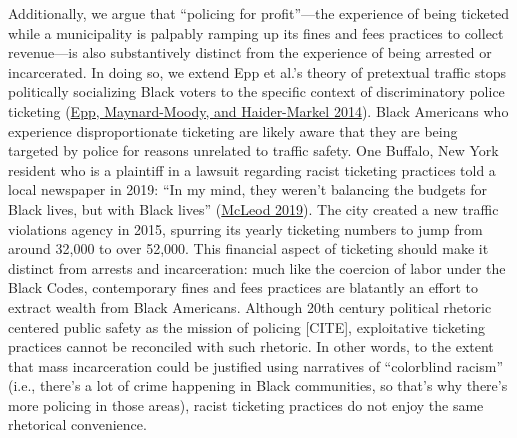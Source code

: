 \documentclass[
  12pt,
]{article}
\begin{document}
Additionally, we argue that ``policing for profit''---the experience of being ticketed while a municipality is palpably ramping up its fines and fees practices to collect revenue---is also substantively distinct from the experience of being arrested or incarcerated. In doing so, we extend Epp et al.'s theory of pretextual traffic stops politically socializing Black voters to the specific context of discriminatory police ticketing (\protect\hyperlink{ref-Epp2014}{Epp, Maynard-Moody, and Haider-Markel 2014}). Black Americans who experience disproportionate ticketing are likely aware that they are being targeted by police for reasons unrelated to traffic safety. One Buffalo, New York resident who is a plaintiff in a lawsuit regarding racist ticketing practices told a local newspaper in 2019: ``In my mind, they weren't balancing the budgets for Black lives, but with Black lives'' (\protect\hyperlink{ref-McLeod2019}{McLeod 2019}). The city created a new traffic violations agency in 2015, spurring its yearly ticketing numbers to jump from around 32,000 to over 52,000. This financial aspect of ticketing should make it distinct from arrests and incarceration: much like the coercion of labor under the Black Codes, contemporary fines and fees practices are blatantly an effort to extract wealth from Black Americans. Although 20th century political rhetoric centered public safety as the mission of policing {[}CITE{]}, exploitative ticketing practices cannot be reconciled with such rhetoric. In other words, to the extent that mass incarceration could be justified using narratives of ``colorblind racism'' (i.e., there's a lot of crime happening in Black communities, so that's why there's more policing in those areas), racist ticketing practices do not enjoy the same rhetorical convenience.
\end{document}
